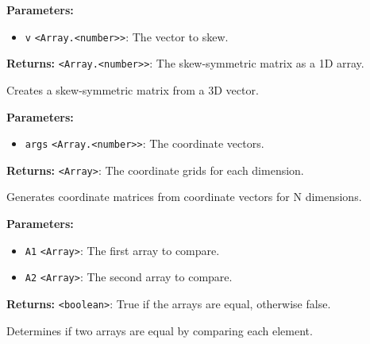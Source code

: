 \documentclass[12pt,a4paper]{article}
\begin{document}
\vspace{5mm}
\noindent {}


\noindent \textbf{Parameters:}
\begin{itemize}
  \item \texttt{v} \texttt{<Array.<number>>}: The vector to skew.
\end{itemize}

\noindent \textbf{Returns:} \texttt{<Array.<number>>}: The skew-symmetric matrix as a 1D array.

\noindent Creates a skew-symmetric matrix from a 3D vector.

\vspace{5mm}
\noindent {}


\noindent \textbf{Parameters:}
\begin{itemize}
  \item \texttt{args} \texttt{<Array.<number>>}: The coordinate vectors.
\end{itemize}

\noindent \textbf{Returns:} \texttt{<Array>}: The coordinate grids for each dimension.

\noindent Generates coordinate matrices from coordinate vectors for N dimensions.

\vspace{5mm}
\noindent {}


\noindent \textbf{Parameters:}
\begin{itemize}
  \item \texttt{A1} \texttt{<Array>}: The first array to compare.
  \item \texttt{A2} \texttt{<Array>}: The second array to compare.
\end{itemize}

\noindent \textbf{Returns:} \texttt{<boolean>}: True if the arrays are equal, otherwise false.

\noindent Determines if two arrays are equal by comparing each element.

\vspace{5mm}
\noindent {}
\end{document}
